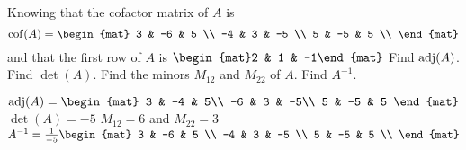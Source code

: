 
\begin{Exercise}[
name={},
title={}, 
difficulty=0,
origin={\cite{MB}}]
Knowing that the cofactor matrix of $A$ is
\[
\cof(A)=
\begin{mat}
  3 & -6 & 5 \\
  -4 & 3 & -5 \\
  5 & -5 & 5 \\
\end{mat}
\] and that the first row of $A$ is $\begin{mat}2 & 1 & -1\end{mat}$
\Question Find $\operatorname{adj}(A)$.
\Question Find $\det(A)$.
\Question Find the minors $M_{12}$ and $M_{22}$ of $A$.
\Question Find $A^{-1}$.
\end{Exercise}

\begin{Answer}
\begin{multicols}{2}
\Question $\adj(A) =
\begin{mat}
3 & -4 & 5\\
-6 & 3 & -5\\
5 & -5 & 5
\end{mat}$
\Question $\det(A) = -5$
\Question $M_{12}=6$ and $M_{22}=3$
\Question $A^{-1}=\frac{1}{-5}
\begin{mat}
  3 & -6 & 5 \\
  -4 & 3 & -5 \\
  5 & -5 & 5 \\
\end{mat}$
\EndCurrentQuestion
\end{multicols}
\end{Answer}

